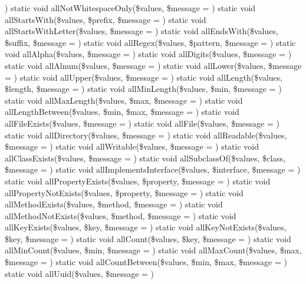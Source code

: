 \textquotesingle{}\textquotesingle{})  static void all\+Not\+Whitespace\+Only(\$values, \$message = \textquotesingle{}\textquotesingle{})  static void all\+Starts\+With(\$values, \$prefix, \$message = \textquotesingle{}\textquotesingle{})  static void all\+Starts\+With\+Letter(\$values, \$message = \textquotesingle{}\textquotesingle{})  static void all\+Ends\+With(\$values, \$suffix, \$message = \textquotesingle{}\textquotesingle{})  static void all\+Regex(\$values, \$pattern, \$message = \textquotesingle{}\textquotesingle{})  static void all\+Alpha(\$values, \$message = \textquotesingle{}\textquotesingle{})  static void all\+Digits(\$values, \$message = \textquotesingle{}\textquotesingle{})  static void all\+Alnum(\$values, \$message = \textquotesingle{}\textquotesingle{})  static void all\+Lower(\$values, \$message = \textquotesingle{}\textquotesingle{})  static void all\+Upper(\$values, \$message = \textquotesingle{}\textquotesingle{})  static void all\+Length(\$values, \$length, \$message = \textquotesingle{}\textquotesingle{})  static void all\+Min\+Length(\$values, \$min, \$message = \textquotesingle{}\textquotesingle{})  static void all\+Max\+Length(\$values, \$max, \$message = \textquotesingle{}\textquotesingle{})  static void all\+Length\+Between(\$values, \$min, \$max, \$message = \textquotesingle{}\textquotesingle{})  static void all\+File\+Exists(\$values, \$message = \textquotesingle{}\textquotesingle{})  static void all\+File(\$values, \$message = \textquotesingle{}\textquotesingle{})  static void all\+Directory(\$values, \$message = \textquotesingle{}\textquotesingle{})  static void all\+Readable(\$values, \$message = \textquotesingle{}\textquotesingle{})  static void all\+Writable(\$values, \$message = \textquotesingle{}\textquotesingle{})  static void all\+Class\+Exists(\$values, \$message = \textquotesingle{}\textquotesingle{})  static void all\+Subclass\+Of(\$values, \$class, \$message = \textquotesingle{}\textquotesingle{})  static void all\+Implements\+Interface(\$values, \$interface, \$message = \textquotesingle{}\textquotesingle{})  static void all\+Property\+Exists(\$values, \$property, \$message = \textquotesingle{}\textquotesingle{})  static void all\+Property\+Not\+Exists(\$values, \$property, \$message = \textquotesingle{}\textquotesingle{})  static void all\+Method\+Exists(\$values, \$method, \$message = \textquotesingle{}\textquotesingle{})  static void all\+Method\+Not\+Exists(\$values, \$method, \$message = \textquotesingle{}\textquotesingle{})  static void all\+Key\+Exists(\$values, \$key, \$message = \textquotesingle{}\textquotesingle{})  static void all\+Key\+Not\+Exists(\$values, \$key, \$message = \textquotesingle{}\textquotesingle{})  static void all\+Count(\$values, \$key, \$message = \textquotesingle{}\textquotesingle{})  static void all\+Min\+Count(\$values, \$min, \$message = \textquotesingle{}\textquotesingle{})  static void all\+Max\+Count(\$values, \$max, \$message = \textquotesingle{}\textquotesingle{})  static void all\+Count\+Between(\$values, \$min, \$max, \$message = \textquotesingle{}\textquotesingle{})  static void all\+Uuid(\$values, \$message = \textquotesingle{}\textquotesingle{})


